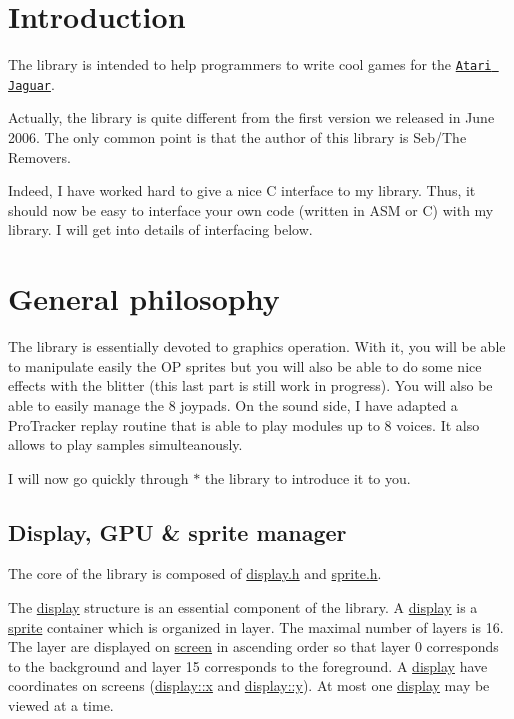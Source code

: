 \hypertarget{index_intro_sec}{}\section{Introduction}\label{index_intro_sec}
The library is intended to help programmers to write cool games for the \href{http://en.wikipedia.org/wiki/Atari_Jaguar}{\tt Atari Jaguar}.

Actually, the library is quite different from the first version we released in June 2006. The only common point is that the author of this library is Seb/The Removers.

Indeed, I have worked hard to give a nice C interface to my library. Thus, it should now be easy to interface your own code (written in ASM or C) with my library. I will get into details of interfacing below.\hypertarget{index_philo_sec}{}\section{General philosophy}\label{index_philo_sec}
The library is essentially devoted to graphics operation. With it, you will be able to manipulate easily the OP sprites but you will also be able to do some nice effects with the blitter (this last part is still work in progress). You will also be able to easily manage the 8 joypads. On the sound side, I have adapted a ProTracker replay routine that is able to play modules up to 8 voices. It also allows to play samples simulteanously.

I will now go quickly through $\ast$ the library to introduce it to you.\hypertarget{index_display_subsec}{}\subsection{Display, GPU \& sprite manager}\label{index_display_subsec}
The core of the library is composed of \hyperlink{display_8h}{display.h} and \hyperlink{sprite_8h}{sprite.h}.

The \hyperlink{structdisplay}{display} structure is an essential component of the library. A \hyperlink{structdisplay}{display} is a \hyperlink{structsprite}{sprite} container which is organized in layer. The maximal number of layers is 16. The layer are displayed on \hyperlink{structscreen}{screen} in ascending order so that layer 0 corresponds to the background and layer 15 corresponds to the foreground. A \hyperlink{structdisplay}{display} have coordinates on screens (\hyperlink{structdisplay_14574f1784d84b7aa04d8a3d83ed2b72}{display::x} and \hyperlink{structdisplay_0ab653a2199638318a2dbbee08062b9c}{display::y}). At most one \hyperlink{structdisplay}{display} may be viewed at a time.

